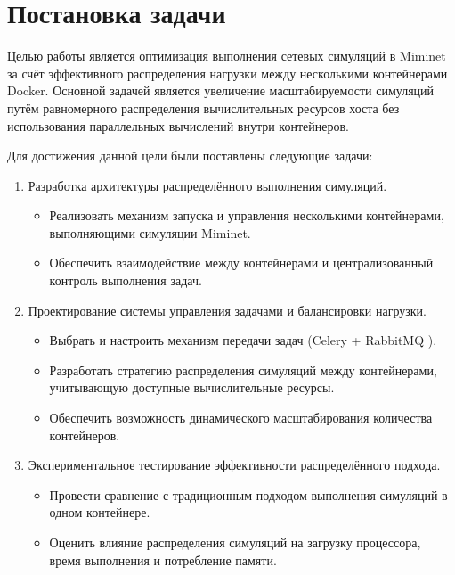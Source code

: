 
\section{Постановка задачи}
\label{sec:task}

Целью работы является оптимизация выполнения сетевых симуляций в Miminet\cite{miminet} за счёт эффективного распределения нагрузки между несколькими контейнерами Docker.
Основной задачей является увеличение масштабируемости симуляций путём равномерного распределения вычислительных ресурсов хоста без использования параллельных вычислений внутри контейнеров.

Для достижения данной цели были поставлены следующие задачи:
\begin{enumerate}
    \item Разработка архитектуры распределённого выполнения симуляций.
        \begin{itemize}
            \item Реализовать механизм запуска и управления несколькими контейнерами, выполняющими симуляции Miminet\cite{miminet}.
            \item Обеспечить взаимодействие между контейнерами и централизованный контроль выполнения задач.
        \end{itemize}
    \item Проектирование системы управления задачами и балансировки нагрузки.
        \begin{itemize}
            \item Выбрать и настроить механизм передачи задач (Celery \cite{celery} + RabbitMQ \cite{rabbitmq}).
            \item Разработать стратегию распределения симуляций между контейнерами, учитывающую доступные вычислительные ресурсы.
            \item Обеспечить возможность динамического масштабирования количества контейнеров.
        \end{itemize}
    \item Экспериментальное тестирование эффективности распределённого подхода.
        \begin{itemize}
            \item Провести сравнение с традиционным подходом выполнения симуляций в одном контейнере.
            \item Оценить влияние распределения симуляций на загрузку процессора, время выполнения и потребление памяти.

\end{itemize}
\end{enumerate}

